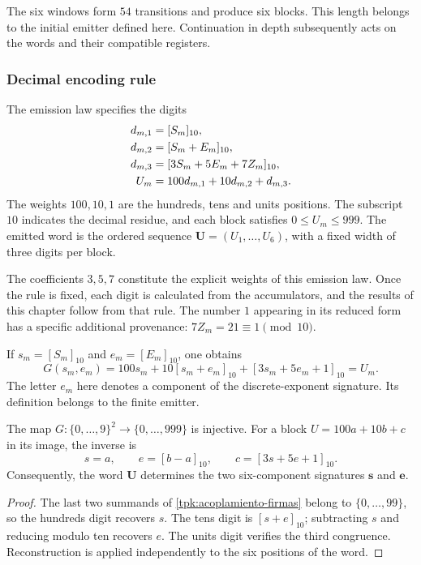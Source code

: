 The six windows form \(54\) transitions and produce six blocks.
This length belongs to the initial emitter defined here. Continuation
in depth subsequently acts on the words and their compatible registers.

\subsubsection{Decimal encoding rule}

The emission law specifies the digits
\begin{align}
 d_{m,1}&=[S_m]_{10},\notag\\
 d_{m,2}&=[S_m+E_m]_{10},\notag\\
 d_{m,3}&=[3S_m+5E_m+7Z_m]_{10},\notag\\
 U_m&=100d_{m,1}+10d_{m,2}+d_{m,3}.
 \label{tpk:bloque-decimal}
\end{align}
The weights \(100,10,1\) are the hundreds, tens and units positions.
The subscript \(10\) indicates the decimal residue, and each block satisfies
\(0\leq U_m\leq999\). The emitted word is the ordered sequence
\(\mathbf U=(U_1,\ldots,U_6)\), with a fixed width of three digits per block.

The coefficients \(3,5,7\) constitute the explicit weights of this emission
law. Once the rule is fixed, each digit is calculated from the
accumulators, and the results of this chapter follow from that rule.
The number \(1\) appearing in its reduced form has a specific additional
provenance: \(7Z_m=21\equiv1\pmod{10}\).

If \(s_m=[S_m]_{10}\) and \(e_m=[E_m]_{10}\), one obtains
\begin{equation}
 G(s_m,e_m)=100s_m+10[s_m+e_m]_{10}
                   +[3s_m+5e_m+1]_{10}=U_m.
 \label{tpk:acoplamiento-firmas}
\end{equation}
The letter \(e_m\) here denotes a component of the discrete-exponent
signature. Its definition belongs to the finite emitter.

\begin{proposicion}
\label{tpk:recuperacion-firmas}
The map \(G:\{0,\ldots,9\}^2\to\{0,\ldots,999\}\) is injective.
For a block \(U=100a+10b+c\) in its image, the inverse is
\[
 s=a,\qquad e=[b-a]_{10},\qquad
 c=[3s+5e+1]_{10}.
\]
Consequently, the word \(\mathbf U\) determines the two six-component
signatures \(\mathbf s\) and \(\mathbf e\).
\end{proposicion}
\begin{proof}
The last two summands of \eqref{tpk:acoplamiento-firmas} belong to
\(\{0,\ldots,99\}\), so the hundreds digit recovers \(s\). The tens digit
is \([s+e]_{10}\); subtracting \(s\) and reducing modulo ten recovers
\(e\). The units digit verifies the third congruence. Reconstruction is
applied independently to the six positions of the word.
\end{proof}

